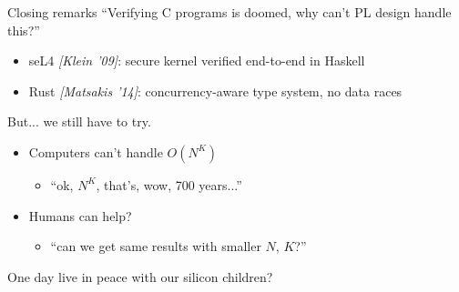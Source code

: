 \documentclass[xcolor=dvipsnames]{beamer}
\begin{document}
\begin{frame}{Closing remarks}
	``Verifying C programs is doomed, why can't PL design handle this?''
	\begin{itemize}
		\item seL4 {\em [Klein '09]}: secure kernel verified end-to-end in Haskell
		\item Rust {\em [Matsakis '14]}: concurrency-aware type system, no data races
	\end{itemize}
	\pause
	\linegap

	But... we still have to try.
	\begin{itemize}
		\item Computers can't handle $O(N^K)$
			\begin{itemize}
				\item ``ok, $N^K$, that's, wow, 700 years...''
			\end{itemize}
		\item Humans can help?
			\begin{itemize}
				\item ``can we get same results with smaller $N$, $K$?''
			\end{itemize}
	\end{itemize}
	\pause
	\linegap

	One day live in peace with our silicon children?
\end{frame}


\end{document}
